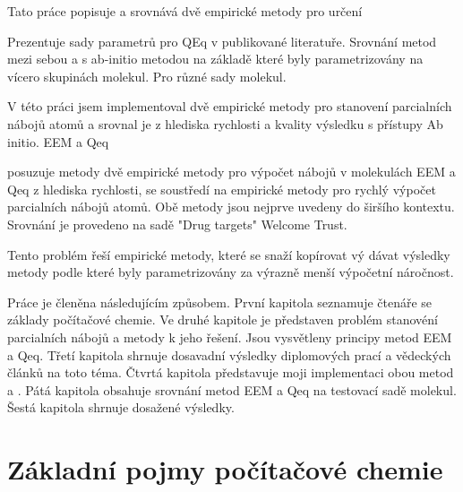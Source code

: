\documentclass[10pt,draft,oneside]{fithesis2}
\newcommand\todo[1]{\textcolor{blue}{[[#1]]}}
\begin{document}
Tato práce popisuje a srovnává dvě empirické metody pro určení

Prezentuje sady parametrů pro QEq v publikované literatuře. Srovnání metod mezi sebou a s ab-initio metodou na základě které byly parametrizovány na vícero skupinách molekul. Pro různé sady molekul. 

V této práci jsem implementoval dvě empirické metody pro stanovení parcialních nábojů atomů a srovnal je z hlediska rychlosti a kvality výsledku s přístupy Ab initio. EEM a Qeq

posuzuje metody dvě empirické metody pro výpočet nábojů v molekulách EEM a Qeq z hlediska rychlosti, se soustředí na empirické metody pro rychlý výpočet parcialních nábojů atomů. Obě metody jsou nejprve uvedeny do širšího kontextu. Srovnání je provedeno na sadě "Drug targets" Welcome Trust. 

Tento problém řeší empirické metody, které se snaží kopírovat vý dávat výsledky metody podle které byly parametrizovány za výrazně menší výpočetní náročnost.

Práce je členěna následujícím způsobem. První kapitola seznamuje čtenáře se základy počítačové chemie. Ve druhé kapitole je představen problém stanovéní parcialních nábojů a metody k jeho řešení. Jsou vysvětleny principy metod EEM a Qeq. Třetí kapitola shrnuje dosavadní výsledky diplomových prací a vědeckých článků na toto téma. Čtvrtá kapitola představuje moji implementaci obou metod a . Pátá kapitola obsahuje srovnání metod EEM a Qeq na testovací sadě molekul. Šestá kapitola shrnuje dosažené výsledky.


\chapter{Základní pojmy počítačové chemie}
\end{document}
